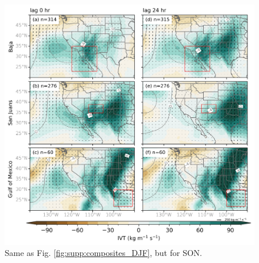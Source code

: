 \documentclass[draft,jgrga]{agutexSI2019}
\begin{document}
\begin{figure}
\noindent\includegraphics[width=\textwidth]{figS8.png}
\caption{Same as Fig. \ref{fig:supp:composites_DJF}, but for SON.}
\label{fig:supp:composites_SON}
\end{figure}



%




\end{document}
